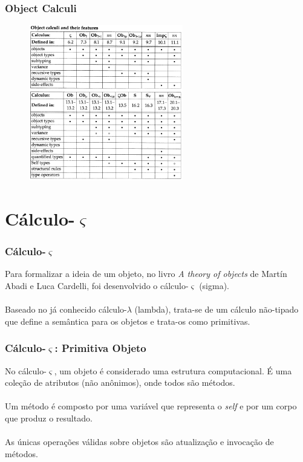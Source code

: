 \documentclass[10pt, compress]{beamer}
\begin{document}
\begin{frame}[fragile]
  \frametitle{Object Calculi}
  \begin{figure}[H]
      \centering
      \includegraphics[width=0.6\textwidth]{objectcalculi.png}
  \end{figure}
\end{frame}

\section{Cálculo-$\varsigma$}

\begin{frame}[fragile]
  \frametitle{Cálculo-$\varsigma$}
  Para formalizar a ideia de um objeto, no livro \textit{A theory of objects} de Martín Abadi e Luca Cardelli,
  foi desenvolvido o cálculo-$\varsigma$ (sigma).
  \\~\\                                                                                                                                              
  Baseado no já conhecido cálculo-$\lambda$ (lambda), trata-se de um cálculo não-tipado que 
  define a semântica para os objetos e trata-os como primitivas.
\end{frame}

\begin{frame}[fragile]
  \frametitle{Cálculo-$\varsigma$: Primitiva Objeto}
  No cálculo-$\varsigma$, um objeto é considerado uma estrutura computacional.
  É uma coleção de atributos (não anônimos), onde todos são métodos.
  \\~\\
  Um método é composto por uma variável que representa o \textit{self} e por um corpo que produz o resultado.
  \\~\\
  As únicas operações válidas sobre objetos são atualização e invocação de métodos.
\end{frame}         
\end{document}
